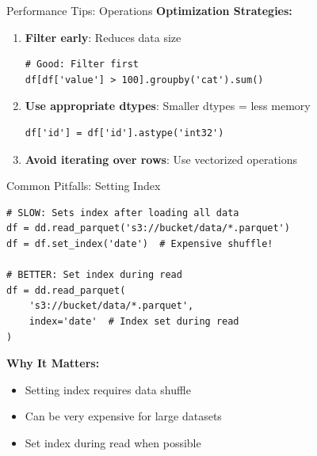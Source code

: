 \documentclass[aspectratio=169]{beamer}
\begin{document}
\begin{frame}[fragile]{Performance Tips: Operations}
\small
\textbf{Optimization Strategies:}

\begin{enumerate}
    \item \textbf{Filter early}: Reduces data size
    \begin{lstlisting}[basicstyle=\ttfamily\tiny]
# Good: Filter first
df[df['value'] > 100].groupby('cat').sum()
    \end{lstlisting}

    \item \textbf{Use appropriate dtypes}: Smaller dtypes = less memory
    \begin{lstlisting}[basicstyle=\ttfamily\tiny]
df['id'] = df['id'].astype('int32')
    \end{lstlisting}

    \item \textbf{Avoid iterating over rows}: Use vectorized operations
\end{enumerate}
\end{frame}

\begin{frame}[fragile]{Common Pitfalls: Setting Index}
\small
\begin{lstlisting}
# SLOW: Sets index after loading all data
df = dd.read_parquet('s3://bucket/data/*.parquet')
df = df.set_index('date')  # Expensive shuffle!

# BETTER: Set index during read
df = dd.read_parquet(
    's3://bucket/data/*.parquet',
    index='date'  # Index set during read
)
\end{lstlisting}

\textbf{Why It Matters:}
\begin{itemize}
    \item Setting index requires data shuffle
    \item Can be very expensive for large datasets
    \item Set index during read when possible
\end{itemize}
\end{frame}
\end{document}
